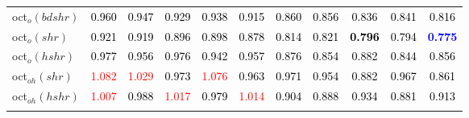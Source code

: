 \begin{tabular}[t]{l|>{}cccc>{}c|ccccc}
oct$_o(bdshr)$ & \textcolor{black}{0.960} & \textcolor{black}{0.947} & \textcolor{black}{0.929} & \textcolor{black}{0.938} & \textcolor{black}{0.915} & \textcolor{black}{0.860} & \textcolor{black}{0.856} & \textcolor{black}{0.836} & \textcolor{black}{0.841} & \textcolor{black}{0.816}\\
oct$_o(shr)$ & \textcolor{black}{0.921} & \textcolor{black}{0.919} & \textcolor{black}{0.896} & \textcolor{black}{0.898} & \textcolor{black}{0.878} & \textcolor{black}{0.814} & \textcolor{black}{0.821} & \textcolor{black}{\textbf{0.796}} & \textcolor{black}{0.794} & \textcolor{blue}{\textbf{0.775}}\\
oct$_o(hshr)$ & \textcolor{black}{0.977} & \textcolor{black}{0.956} & \textcolor{black}{0.976} & \textcolor{black}{0.942} & \textcolor{black}{0.957} & \textcolor{black}{0.876} & \textcolor{black}{0.854} & \textcolor{black}{0.882} & \textcolor{black}{0.844} & \textcolor{black}{0.856}\\
oct$_{oh}(shr)$ & \textcolor{red}{1.082} & \textcolor{red}{1.029} & \textcolor{black}{0.973} & \textcolor{red}{1.076} & \textcolor{black}{0.963} & \textcolor{black}{0.971} & \textcolor{black}{0.954} & \textcolor{black}{0.882} & \textcolor{black}{0.967} & \textcolor{black}{0.861}\\
oct$_{oh}(hshr)$ & \textcolor{red}{1.007} & \textcolor{black}{0.988} & \textcolor{red}{1.017} & \textcolor{black}{0.979} & \textcolor{red}{1.014} & \textcolor{black}{0.904} & \textcolor{black}{0.888} & \textcolor{black}{0.934} & \textcolor{black}{0.881} & \textcolor{black}{0.913}\\
\bottomrule
{}\\
\end{tabular}
